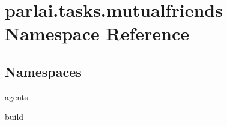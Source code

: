 \hypertarget{namespaceparlai_1_1tasks_1_1mutualfriends}{}\section{parlai.\+tasks.\+mutualfriends Namespace Reference}
\label{namespaceparlai_1_1tasks_1_1mutualfriends}
\subsection*{Namespaces}
\begin{DoxyCompactItemize}
\item 
 \hyperlink{namespaceparlai_1_1tasks_1_1mutualfriends_1_1agents}{agents}
\item 
 \hyperlink{namespaceparlai_1_1tasks_1_1mutualfriends_1_1build}{build}
\end{DoxyCompactItemize}
